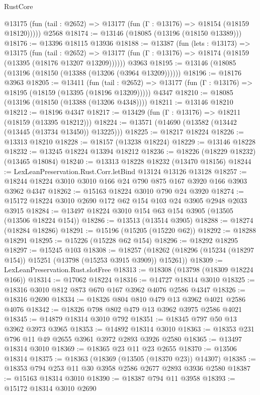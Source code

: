 \begin{lexlean}{RustCore}
\begin{coremodule}
      @13175 (fun (tail : @2652) => @13177 (fun (Γ : @13176) => @18154 (@18159 @18120)))))
    @2568
@18174 := @13146 (@18085 (@13196 (@18150 @13389)))
@18176 := @13396 @18115 @13936
@18188 := @13387
    (fun (lets : @13173) =>
    @13175
      (fun (tail : @2652) =>
      @13177 (fun (Γ : @13176) => @18174 (@18159 (@13395 (@18176 @13207 @13209))))))
    @3963
@18195 := @13146 (@18085 (@13196 (@18150 (@13388 (@13206 (@3964 @13209))))))
@18196 := @18176 @3963
@18205 := @13411
    (fun (tail : @2652) => @13177 (fun (Γ : @13176) => @18195 (@18159 (@13395 (@18196 @13209)))))
    @4347
@18210 := @18085 (@13196 (@18150 (@13388 (@13206 @4348))))
@18211 := @13146 @18210
@18212 := @18196 @4347
@18217 := @13429 (fun (Γ : @13176) => @18211 (@18159 (@13395 @18212)))
@18224 := @13571 (@14690 (@13582 (@13442 (@13445 (@13734 @13450)) @13225)))
@18225 := @18217 @18224
@18226 := @13313 @18210
@18228 := @18157 (@13238 @18224)
@18229 := @13146 @18228
@18232 := @13245 @18224 @13394 @18212
@18236 := @18226 (@18229 @18232) (@13465 @18084)
@18240 := @13313 @18228 @18232 (@13470 @18156)
@18244 := LexLeanPreservation.Rust.Corr.letBind @13124 @13126 @13128
@18257 := @18244 @18224 @3010 @3010 @166 @24 @790 @875 @167 @3920 @166 @3903 @3962 @4347
@18262 := @15163 @18224 @3010 @790 @24 @3920
@18274 := @15172 @18224 @3010 @2690 @172 @62 @154 @103 @24 @3905 @2948 @2033 @3915
@18284 := @13497 @18224 @3010 @154 @63 @154 @3905 (@13505 (@13506 @18224 @154))
@18286 := @13513 (@13514 @3905)
@18288 := @18274 (@18284 @18286)
@18291 := @15196 (@15205 (@15220 @62))
@18292 := @18288 @18291
@18295 := @15226 (@15228 @62 @154)
@18296 := @18292 @18295
@18297 := @15245 @103
@18308 := @18257
    (@18262 (@18296 (@15234 (@18297 @154)) @15251 (@13798 (@15253 @3915 @3909)) @15261))
@18309 := LexLeanPreservation.Rust.slotFree
@18313 := @18308 (@13798 (@18309 @18224 @166))
@18314 := @17062 @18224
@18316 := @14727 @18314 @3010
@18325 := @18316 @3010 @812 @873 @670 @167 @3962 @4076 @2586 @4347
@18326 := @18316 @2690
@18334 := @18326 @804 @810 @479 @13 @3962 @4021 @2586 @4076
@18342 := @18326 @798 @802 @479 @13 @3962 @3975 @2586 @4021
@18345 := @14879 @18314 @3010 @792
@18351 := @18345 @797 @50 @13 @3962 @3973 @3965
@18353 := @14892 @18314 @3010
@18363 := @18353 @231 @796 @11 @49 @2655 @3961 @3972 @2893 @3926 @2580
@18365 := @13497 @18314 @3010
@18369 := @18365 @23 @11 @23 @2655
@18370 := @13506 @18314
@18375 := @18363 (@18369 (@13505 (@18370 @23)) @14307)
@18385 := @18353 @794 @253 @11 @30 @3958 @2586 @2677 @2893 @3936 @2580
@18387 := @15163 @18314 @3010
@18390 := @18387 @794 @11 @3958
@18393 := @15172 @18314 @3010 @2690

\end{coremodule}
\end{lexlean}
